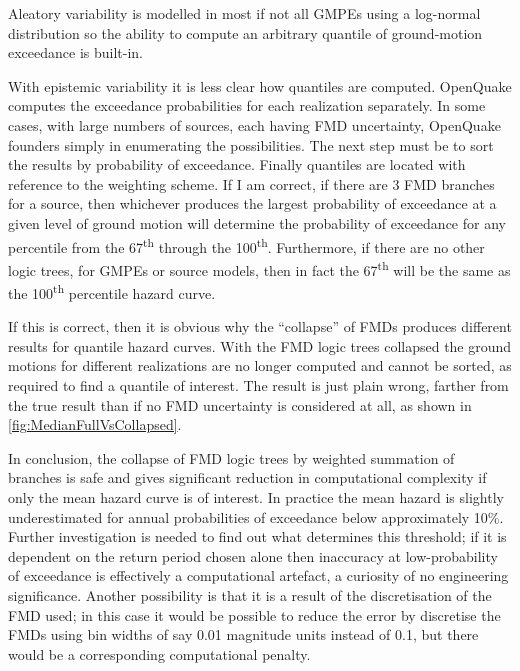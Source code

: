 \documentclass{article}
\begin{document}
Aleatory variability is modelled in most if not all GMPEs using a log-normal distribution so the ability to compute an arbitrary quantile of ground-motion exceedance is built-in. 

With epistemic variability it is less clear how quantiles are computed. 
OpenQuake computes the exceedance probabilities for each realization separately. 
In some cases, with large numbers of sources, each having FMD uncertainty, OpenQuake founders simply in enumerating the possibilities. 
The next step must be to sort the results by probability of exceedance. 
Finally quantiles are located with reference to the weighting scheme. 
If I am correct, if there are 3 FMD branches for a source, then whichever produces the largest probability of exceedance at a given level of ground motion will determine the probability of exceedance for any percentile from the 67\textsuperscript{th} through the 100\textsuperscript{th}. 
Furthermore, if there are no other logic trees, for GMPEs or source models, then in fact the 67\textsuperscript{th} will be the same as the 100\textsuperscript{th} percentile hazard curve.

If this is correct, then it is obvious why the ``collapse'' of FMDs produces different results for quantile hazard curves. 
With the FMD logic trees collapsed the ground motions for different realizations are no longer computed and cannot be sorted, as required to find a quantile of interest. 
The result is just plain wrong, farther from the true result than if no FMD uncertainty is considered at all, as shown in \autoref{fig:MedianFullVsCollapsed}.

In conclusion, the collapse of FMD logic trees by weighted summation of branches is safe and gives significant reduction in computational complexity if only the mean hazard curve is of interest. 
In practice the mean hazard is slightly underestimated for annual probabilities of exceedance below approximately 10\%. 
Further investigation is needed to find out what determines this threshold; if it is dependent on the return period chosen alone then inaccuracy at low-probability of exceedance is effectively a computational artefact, a curiosity of no engineering significance. 
Another possibility is that it is a result of the discretisation of the FMD used; in this case it would be possible to reduce the error by discretise the FMDs using bin widths of say 0.01 magnitude units instead of 0.1, but there would be a corresponding computational penalty.



\end{document}
